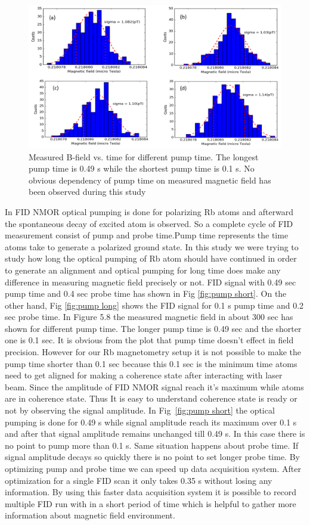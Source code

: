    \begin{figure}[h]
\centering\includegraphics[width=0.75\linewidth]{figures/pump_time}
\caption{Measured B-field vs. time   for different pump time. The longest pump time is 0.49 s while the shortest pump time is 0.1 s. No obvious dependency of pump time on  measured magnetic field has been observed during this study}
\end{figure}
In FID NMOR optical pumping is done for polarizing Rb atoms and afterward the spontaneous decay of excited atom is observed. So a complete cycle of FID measurement consist of pump and probe time.Pump time represents the time atoms take to generate a polarized ground state. In this study we were trying to study how long the optical pumping of Rb atom should have continued in order to generate an alignment and optical pumping for long time does make any difference in measuring magnetic field precisely or not. FID signal with 0.49 sec pump time and 0.4 sec probe time has shown in Fig \ref{fig:pump short}. On the other hand, Fig \ref{fig:pump long} shows  the FID signal for 0.1 s pump time and 0.2 sec probe time. In Figure 5.8 the measured magnetic field in about 300 sec has shown for different pump time. The longer pump time is 0.49 sec and the shorter one is 0.1 sec. It is obvious from the plot that pump time doesn't effect in field precision. However for our Rb magnetometry setup it is not possible to make the pump time shorter than 0.1 sec because this 0.1 sec is the minimum time atoms need to get aligned for making a coherence state after interacting with laser beam. Since the amplitude of FID NMOR signal reach it's maximum while atoms are in coherence state. Thus It is easy to understand coherence state is ready or not by observing the signal amplitude. In Fig~\ref{fig:pump short} the optical pumping is done for 0.49 s while signal amplitude reach its maximum over 0.1 s and after that signal amplitude remains unchanged till 0.49 s. In this case there is no point to pump more than 0.1 s. Same situation happens about probe time. If signal amplitude decays so quickly there is no point to set longer probe time. By optimizing pump and probe time we can speed up data acquisition system. After optimization for a single FID scan it only takes 0.35 s  without losing any information. By using this faster data acquisition system it is possible to record multiple FID run with in a short period of time which is helpful to gather more information about magnetic field environment.
\newpage
